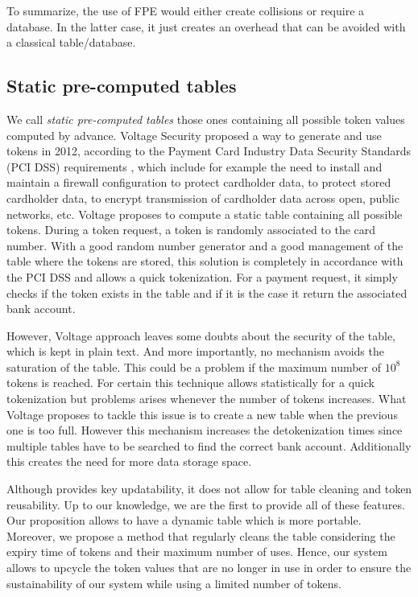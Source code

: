 \documentclass{llncs}
\newcounter{prob}
\begin{document}
To summarize, the use of FPE would either create collisions or require a database. In the latter case, it just creates an overhead that can be avoided with a classical table/database.



\subsection{Static pre-computed tables}

We call \textit{static pre-computed tables} those ones containing all possible token values computed by advance. Voltage Security proposed a way to generate and use tokens \cite{Voltage} in 2012, according to the Payment Card Industry Data Security Standards (PCI DSS) requirements \cite{PCI-DSS}, which include for example the need to install and maintain a firewall configuration to protect cardholder data, to protect stored cardholder data, to encrypt transmission of cardholder data across open, public networks, etc. Voltage proposes to compute a static table containing all possible tokens. During a token request, a token is randomly associated to the card number. With a good random number generator and a good management of the table where the tokens are stored, this solution is completely in accordance with the PCI DSS and allows a quick tokenization. For a payment request, it simply checks if the token exists in the table and if it is the case it return the associated bank account.

However, Voltage approach leaves some doubts about the security of the table, which is kept in plain text. And more importantly, no mechanism avoids the saturation of the table. This could be a problem if the maximum number of $10^8$ tokens is reached. For certain this technique allows statistically for a quick tokenization but problems arises whenever the number of tokens increases. What Voltage proposes to tackle this issue is to create a new table when the previous one is too full. However this mechanism increases the detokenization times since multiple tables have to be searched to find the correct bank account. Additionally this creates the need for more data storage space.

Although \cite{Cachin2017} provides key updatability, it does not allow for table cleaning and token reusability. Up to our knowledge, we are the first to provide all of these features. Our proposition allows to have a dynamic table which is more portable. Moreover, we propose a method that regularly cleans the table considering the expiry time of tokens and their maximum number of uses. Hence, our system allows to upcycle the token values that are no longer in use in order to ensure the sustainability of our system while using a limited number of tokens.
\end{document}
